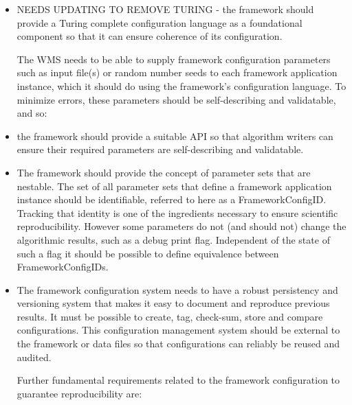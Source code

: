\documentclass[../main-v1.tex]{subfiles}
\begin{document}
\begin{itemize}
\item NEEDS UPDATING TO REMOVE TURING - the framework should provide a Turing complete configuration language as a foundational component so that it can ensure coherence of its configuration.

The WMS needs to be able to supply framework configuration parameters such as input file(s) or random number seeds to each framework application instance, which it should do using the framework’s configuration language.  To minimize errors, these parameters should be self-describing and validatable, and so:

\item the framework should provide a suitable API so that algorithm writers can ensure their required parameters are self-describing and validatable.

\item The framework should provide the concept of parameter sets that are nestable.  The set of all parameter sets that define a framework application instance should be identifiable, referred to here as a FrameworkConfigID.  Tracking that identity is one of the ingredients necessary to ensure scientific reproducibility.  However some parameters do not (and should not) change the algorithmic results, such as a debug print flag.  Independent of the state of such a flag it should be possible to define equivalence between FrameworkConfigIDs.

\item The framework configuration system needs to have a robust persistency and versioning system that makes it easy to document and reproduce previous results.  It must be possible to create, tag, check-sum, store and compare configurations.  This configuration management system should be external to the framework or data files so that configurations can reliably be reused and audited.  

Further fundamental requirements related to the framework configuration to guarantee reproducibility are:


\end{itemize}
\end{document}

